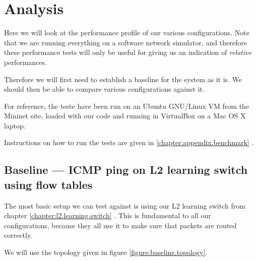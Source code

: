 \chapter{Analysis}

Here we will look at the performance profile of our various configurations.
Note that we are running everything on a software network simulator, and
therefore these performance tests will only be useful for giving us an
indication of \textit{relative} performances.

Therefore we will first need to establish a baseline for the system as it
is. We should then be able to compare various configurations against it.


For reference, the teste have been run on an Ubuntu GNU/Linux VM from the
Mininet site, loaded with our code and running in VirtualBox on a Mac OS X
laptop.

Instructions on how to run the tests are given in
\ref{chapter:appendix.benchmark}
.

\section{Baseline --- ICMP ping on L2 learning switch using flow tables}
\label{chapter:baseline.benchmark}

The most basic setup we can test against is using our L2 learning switch
from chapter \ref{chapter:l2.learning.switch}
.  This is fundamental to all our
configurations, because they all use it to make sure that packets are routed
correctly.

We will use the topology given in figure \ref{figure:baseline.topology}.

